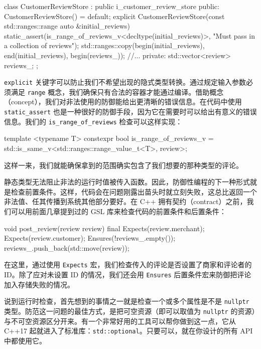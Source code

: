 \begin{codebox}[cpp]
class CustomerReviewStore : public i_customer_review_store {
 public:
  CustomerReviewStore() = default;
  explicit CustomerReviewStore(const std::ranges::range auto  
                               &initial_reviews) {
  static_assert(is_range_of_reviews_v<decltype(initial_reviews)>,
                "Must pass in a collection of reviews");
  std::ranges::copy(begin(initial_reviews), end(initial_reviews),
                    begin(reviews_));
  }
 //...
 private:
  std::vector<review> reviews_;
};
\end{codebox}

\texttt{explicit} 关键字可以防止我们不希望出现的隐式类型转换。通过规定输入参数必须满足 \texttt{range} 概念，我们确保只有合法的容器才能通过编译。借助概念（concept），我们对非法使用的防御能给出更清晰的错误信息。在代码中使用 \texttt{static\_\allowbreak{}assert} 也是一种很好的防御手段，因为它在需要时可以给出有意义的错误信息。我们的 \texttt{is\_\allowbreak{}range\_\allowbreak{}of\_\allowbreak{}reviews} 检查可以这样实现：

\begin{codebox}[cpp]
template <typename T>
constexpr bool is_range_of_reviews_v =
    std::is_same_v<std::ranges::range_value_t<T>, review>;
\end{codebox}

这样一来，我们就能确保拿到的范围确实包含了我们想要的那种类型的评论。

静态类型无法阻止非法的运行时值被传入函数。因此，防御性编程的下一种形式就是检查前置条件。这样，代码会在问题刚露出苗头时就立刻失败，这总比返回一个非法值、任其传播到系统其他部分要好。在 C++ 拥有契约（contract）之前，我们可以用前面几章提到过的 GSL 库来检查代码的前置条件和后置条件：

\begin{codebox}[cpp]
void post_review(review review) final {
  Expects(review.merchant);
  Expects(review.customer);
  Ensures(!reviews_.empty());
  reviews_.push_back(std::move(review));
}
\end{codebox}

\label{idx:875}
在这里，通过使用 \texttt{Expects} 宏，我们检查传入的评论是否设置了商家和评论者的 ID。除了应对未设置 ID 的情况，我们还会用 \texttt{Ensures} 后置条件宏来防御把评论加入存储失败的情况。

说到运行时检查，首先想到的事情之一就是检查一个或多个属性是不是 \texttt{nullptr} 类型。防范这一问题的最佳方式，是把可空资源（即可以取值为 \texttt{nullptr} 的资源）与不可空资源区分开来。有一个非常好用的工具可以帮你做到这一点，它从 C++17 起就进入了标准库：\texttt{std::\allowbreak{}optional}。只要可以，就在你设计的所有 API 中都使用它。

